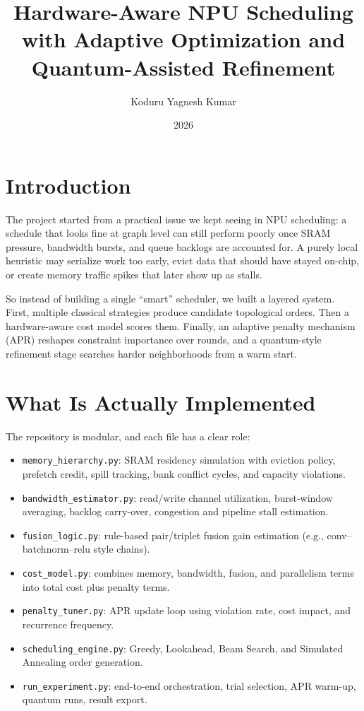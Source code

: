 \documentclass[11pt]{article}
\title{Hardware-Aware NPU Scheduling with Adaptive Optimization and Quantum-Assisted Refinement}
\author{Koduru Yagnesh Kumar}
\date{2026}
\begin{document}
\maketitle

\section{Introduction}
The project started from a practical issue we kept seeing in NPU scheduling: a schedule that looks fine at graph level can still perform poorly once SRAM pressure, bandwidth bursts, and queue backlogs are accounted for. A purely local heuristic may serialize work too early, evict data that should have stayed on-chip, or create memory traffic spikes that later show up as stalls.

So instead of building a single ``smart'' scheduler, we built a layered system. First, multiple classical strategies produce candidate topological orders. Then a hardware-aware cost model scores them. Finally, an adaptive penalty mechanism (APR) reshapes constraint importance over rounds, and a quantum-style refinement stage searches harder neighborhoods from a warm start.

\section{What Is Actually Implemented}
The repository is modular, and each file has a clear role:
\begin{itemize}
    \item \texttt{memory\_hierarchy.py}: SRAM residency simulation with eviction policy, prefetch credit, spill tracking, bank conflict cycles, and capacity violations.
    \item \texttt{bandwidth\_estimator.py}: read/write channel utilization, burst-window averaging, backlog carry-over, congestion and pipeline stall estimation.
    \item \texttt{fusion\_logic.py}: rule-based pair/triplet fusion gain estimation (e.g., conv--batchnorm--relu style chains).
    \item \texttt{cost\_model.py}: combines memory, bandwidth, fusion, and parallelism terms into total cost plus penalty terms.
    \item \texttt{penalty\_tuner.py}: APR update loop using violation rate, cost impact, and recurrence frequency.
    \item \texttt{scheduling\_engine.py}: Greedy, Lookahead, Beam Search, and Simulated Annealing order generation.
    \item \texttt{run\_experiment.py}: end-to-end orchestration, trial selection, APR warm-up, quantum runs, result export.
\end{itemize}
\end{document}
